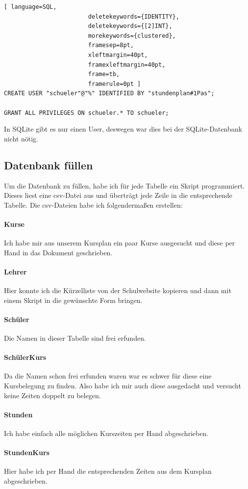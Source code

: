 \documentclass[a4paper, 12pt]{article}
\theoremstyle{plain}
\theoremstyle{definition}
\begin{document}
	\begin{lstlisting}[ language=SQL,
	                    deletekeywords={IDENTITY},
	                    deletekeywords={[2]INT},
	                    morekeywords={clustered},
	                    framesep=8pt,
	                    xleftmargin=40pt,
	                    framexleftmargin=40pt,
	                    frame=tb,
	                    framerule=0pt ]	
CREATE USER "schueler"@"%" IDENTIFIED BY "stundenplan#1Pas";

GRANT ALL PRIVILEGES ON schueler.* TO schueler;\end{lstlisting}	
	In SQLite gibt es nur einen User, deswegen war dies bei der SQLite-Datenbank nicht nötig.
	\subsection{Datenbank füllen}
	Um die Datenbank zu füllen, habe ich für jede Tabelle ein Skript programmiert. Dieses liest eine csv-Datei aus und überträgt jede Zeile in die entsprechende Tabelle. Die csv-Dateien habe ich folgendermaßen erstellen:
	\paragraph{Kurse} Ich habe mir aus unserem Kursplan ein paar Kurse ausgesucht und diese per Hand in das Dokument geschrieben.
	\paragraph{Lehrer} Hier konnte ich die Kürzelliste von der Schulwebsite kopieren und dann mit einem Skript in die gewünschte Form bringen.
	\paragraph{Schüler} Die Namen in dieser Tabelle sind frei erfunden.
	\paragraph{SchülerKurs} Da die Namen schon frei erfunden waren war es schwer für diese eine Kursbelegung zu finden. Also habe ich mir auch diese ausgedacht und versucht keine Zeiten doppelt zu belegen.
	\paragraph{Stunden} Ich habe einfach alle möglichen Kurszeiten per Hand abgeschrieben.
	\paragraph{StundenKurs} Hier habe ich per Hand die entsprechenden Zeiten aus dem Kursplan abgeschrieben.
\end{document}
